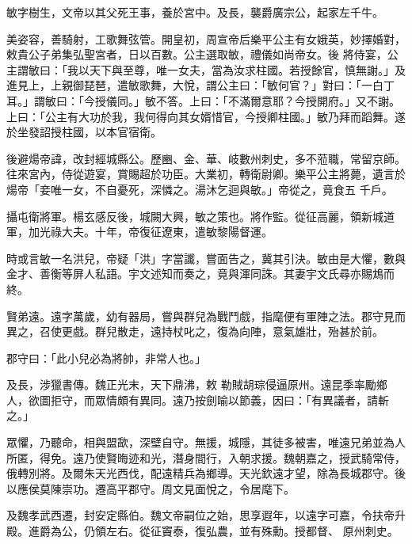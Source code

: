 \begin{pinyinscope}
 敏字樹生，文帝以其父死王事，養於宮中。及長，襲爵廣宗公，起家左千牛。



 美姿容，善騎射，工歌舞弦管。開皇初，周宣帝后樂平公主有女娥英，妙擇婚對，敕貴公子弟集弘聖宮者，日以百數。公主選取敏，禮儀如尚帝女。後
 將侍宴，公主謂敏曰：「我以天下與至尊，唯一女夫，當為汝求柱國。若授餘官，慎無謝。」及進見上，上親御琵琶，遣敏歌舞，大悅，謂公主曰：「敏何官？」對曰：「一白丁耳。」謂敏曰：「今授儀同。」敏不答。上曰：「不滿爾意耶？今授開府。」又不謝。上曰：「公主有大功於我，我何得向其女婿惜官，今授卿柱國。」敏乃拜而蹈舞。遂於坐發詔授柱國，以本官宿衛。



 後避煬帝諱，改封經城縣公。歷豳、金、華、岐數州刺史，多不蒞職，常留京師。往來宮內，侍從遊宴，賞賜超於功臣。大業初，轉衛尉卿。樂平公主將薨，遺言於煬帝「妾唯一女，不自憂死，深憐之。湯沐乞迴與敏。」帝從之，竟食五
 千戶。



 攝屯衛將軍。楊玄感反後，城闕大興，敏之策也。將作監。從征高麗，領新城道軍，加光祿大夫。十年，帝復征遼東，遣敏黎陽督運。



 時或言敏一名洪兒，帝疑「洪」字當讖，嘗面告之，冀其引決。敏由是大懼，數與金才、善衡等屏人私語。宇文述知而奏之，竟與渾同誅。其妻宇文氏尋亦賜鴆而終。



 賢弟遠。遠字萬歲，幼有器局，嘗與群兒為戰鬥戲，指麾便有軍陣之法。郡守見而異之，召使更戲。群兒散走，遠持杖叱之，復為向陣，意氣雄壯，殆甚於前。



 郡守曰：「此小兒必為將帥，非常人也。」



 及長，涉獵書傳。魏正光末，天下鼎沸，敕
 勒賊胡琮侵逼原州。遠昆季率勵鄉人，欲圖拒守，而眾情頗有異同。遠乃按劍喻以節義，因曰：「有異議者，請斬之。」



 眾懼，乃聽命，相與盟歃，深壁自守。無援，城隱，其徒多被害，唯遠兄弟並為人所匿，得免。遠乃使賢晦迹和光，潛身間行，入朝求援。魏朝嘉之，授武騎常侍，俄轉別將。及爾朱天光西伐，配遠精兵為鄉導。天光欽遠才望，除為長城郡守。後以應侯莫陳崇功。遷高平郡守。周文見面悅之，令居麾下。



 及魏孝武西遷，封安定縣伯。魏文帝嗣位之始，思享遐年，以遠字可嘉，令扶帝升殿。進爵為公，仍領左右。從征竇泰，復弘農，並有殊勳。授都督、
 原州刺史。




\end{pinyinscope}
